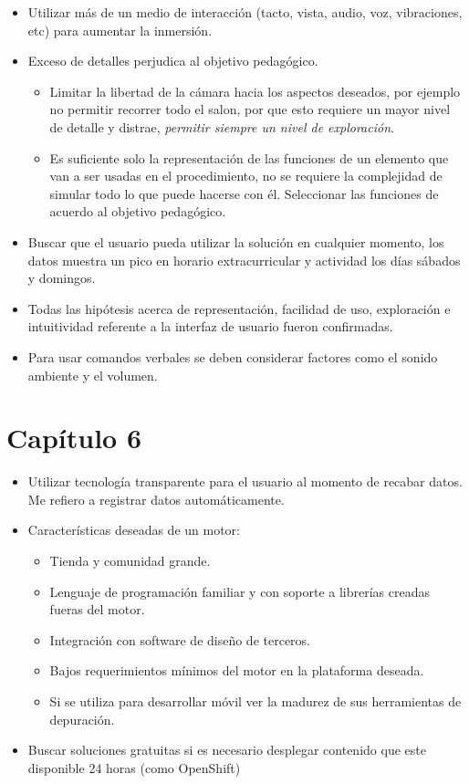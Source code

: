 \begin{itemize}

\item Utilizar más de un medio de interacción (tacto, vista, audio, voz,
    vibraciones, etc) para aumentar la inmersión.
\item Exceso de detalles perjudica al objetivo pedagógico.
    \begin{itemize}
    \item Limitar la libertad de la cámara hacia los aspectos deseados, por
        ejemplo no permitir recorrer todo el salon, por que esto requiere un
        mayor nivel de detalle y distrae, \emph{permitir siempre un nivel de
            exploración}.
    \item Es suficiente solo la representación de las funciones de un elemento
        que van a ser usadas en el procedimiento, no se requiere la complejidad
        de simular todo lo que puede hacerse con él. Seleccionar las funciones
        de acuerdo al objetivo pedagógico.
    \end{itemize}
\item Buscar que el usuario pueda utilizar la solución en cualquier momento, los
    datos muestra un pico en horario extracurricular y actividad los días
    sábados y domingos.
\item Todas las hipótesis acerca de representación, facilidad de uso,
    exploración e intuitividad referente a la interfaz de usuario fueron
    confirmadas.
\item Para usar comandos verbales se deben considerar factores como el sonido
    ambiente y el volumen.

\end{itemize}

\section{Capítulo 6}

\begin{itemize}

\item Utilizar tecnología transparente para el usuario al momento de recabar
    datos. Me refiero a registrar datos automáticamente.
\item Características deseadas de un motor:
\begin{itemize}
    \item Tienda y comunidad grande.
    \item Lenguaje de programación familiar y con soporte a librerías creadas
        fueras del motor.
    \item Integración con software de diseño de terceros.
    \item Bajos requerimientos mínimos del motor en la plataforma deseada.
    \item Si se utiliza para desarrollar móvil ver la madurez de sus
        herramientas de depuración.
\end{itemize}
\item Buscar soluciones gratuitas si es necesario desplegar contenido que este
    disponible 24 horas (como OpenShift)

\end{itemize}
